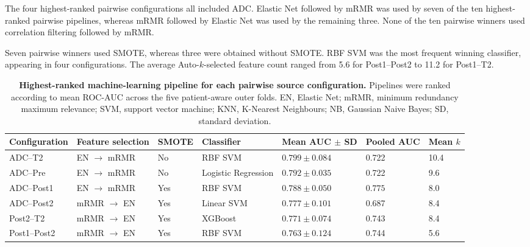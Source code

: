 \documentclass[12pt,twocolumn]{article}
\begin{document}
The four highest-ranked pairwise configurations all included ADC.
Elastic Net followed by mRMR was used by seven of the ten
highest-ranked pairwise pipelines, whereas mRMR followed by Elastic
Net was used by the remaining three. None of the ten pairwise winners
used correlation filtering followed by mRMR.

Seven pairwise winners used SMOTE, whereas three were obtained
without SMOTE. RBF SVM was the most frequent winning classifier,
appearing in four configurations. The average Auto-\(k\)-selected
feature count ranged from 5.6 for Post1--Post2 to 11.2 for
Post1--T2.







\begin{table}[htbp]
\centering
\caption{\textbf{Highest-ranked machine-learning pipeline for each
pairwise source configuration.}
Pipelines were ranked according to mean ROC-AUC across the five
patient-aware outer folds. EN, Elastic Net; mRMR, minimum redundancy
maximum relevance; SVM, support vector machine; KNN, K-Nearest
Neighbours; NB, Gaussian Naive Bayes; SD, standard deviation.}
\label{tab:pairwise_results}
\scriptsize
\begin{tabularx}{\textwidth}{
    p{1.9cm}
    p{2.6cm}
    p{1.1cm}
    p{2.3cm}
    p{2.4cm}
    p{1.8cm}
    X
}
\toprule
\textbf{Configuration} &
\textbf{Feature selection} &
\textbf{SMOTE} &
\textbf{Classifier} &
\textbf{Mean AUC \(\pm\) SD} &
\textbf{Pooled AUC} &
\textbf{Mean \(k\)} \\
\midrule

ADC--T2 &
EN \(\rightarrow\) mRMR &
No &
RBF SVM &
\(\mathbf{0.799 \pm 0.084}\) &
0.722 &
10.4 \\

ADC--Pre &
EN \(\rightarrow\) mRMR &
No &
Logistic Regression &
\(0.792 \pm 0.035\) &
0.722 &
9.6 \\

ADC--Post1 &
EN \(\rightarrow\) mRMR &
Yes &
RBF SVM &
\(0.788 \pm 0.050\) &
\(\mathbf{0.775}\) &
8.0 \\

ADC--Post2 &
mRMR \(\rightarrow\) EN &
Yes &
Linear SVM &
\(0.777 \pm 0.101\) &
0.687 &
8.4 \\

Post2--T2 &
mRMR \(\rightarrow\) EN &
Yes &
XGBoost &
\(0.771 \pm 0.074\) &
0.743 &
8.4 \\

Post1--Post2 &
mRMR \(\rightarrow\) EN &
Yes &
RBF SVM &
\(0.763 \pm 0.124\) &
0.744 &
5.6 \\


\end{tabularx}
\end{table}
\end{document}
